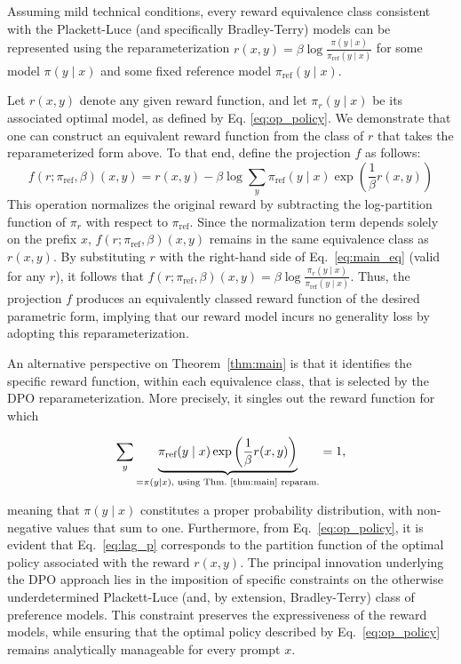 \begin{theorem}\label{thm:main}
    Assuming mild technical conditions, every reward equivalence class consistent with the Plackett-Luce (and specifically Bradley-Terry) models can be represented using the reparameterization ${r(x, y) = \beta \log \frac{\pi(y\mid x)}{\pi_\text{ref}(y\mid x)}}$ for some model $\pi(y\mid x)$ and some fixed reference model $\pi_\text{ref}(y \mid x)$.
\end{theorem}

\begin{sproof}
    Let $r(x, y)$ denote any given reward function, and let $\pi_r(y \mid x)$ be its associated optimal model, as defined by Eq. \ref{eq:op_policy}. We demonstrate that one can construct an equivalent reward function from the class of $r$ that takes the reparameterized form above. To that end, define the projection $f$ as follows:
\begin{equation}
    f(r; \pi_\text{ref}, \beta)(x, y) = r(x, y) - \beta\log\sum_{y}\pi_\text{ref}(y\mid x)\exp\left(\frac{1}{\beta}r(x, y)\right)
\end{equation}
This operation normalizes the original reward by subtracting the log-partition function of $\pi_r$ with respect to $\pi_\text{ref}$. Since the normalization term depends solely on the prefix $x$, $f(r; \pi_\text{ref}, \beta)(x, y)$ remains in the same equivalence class as $r(x, y)$. By substituting $r$ with the right-hand side of Eq.~\ref{eq:main_eq} (valid for any $r$), it follows that $f(r; \pi_\text{ref}, \beta)(x, y) = \beta \log \frac{\pi_r(y\mid x)}{\pi_\text{ref}(y\mid x)}$. Thus, the projection $f$ produces an equivalently classed reward function of the desired parametric form, implying that our reward model incurs no generality loss by adopting this reparameterization.
\end{sproof}

An alternative perspective on Theorem~\ref{thm:main} is that it identifies the specific reward function, within each equivalence class, that is selected by the DPO reparameterization. More precisely, it singles out the reward function for which

\begin{equation}\label{eq:lag_p}
     \sum_{y}\underbrace{\pi_\text{ref}(y\mid x)\exp\left(\frac{1}{\beta}r(x, y)\right)}_{=\pi(y\mid x)\text{, using Thm.~\ref{thm:main} reparam.}} = 1,
\end{equation}

meaning that $\pi(y\mid x)$ constitutes a proper probability distribution, with non-negative values that sum to one. Furthermore, from Eq.~\ref{eq:op_policy}, it is evident that Eq.~\ref{eq:lag_p} corresponds to the partition function of the optimal policy associated with the reward $r(x, y)$. The principal innovation underlying the DPO approach lies in the imposition of specific constraints on the otherwise underdetermined Plackett-Luce (and, by extension, Bradley-Terry) class of preference models. This constraint preserves the expressiveness of the reward models, while ensuring that the optimal policy described by Eq.~\ref{eq:op_policy} remains analytically manageable for every prompt $x$.

